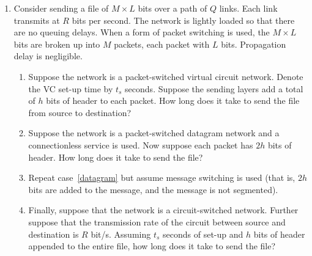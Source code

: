 \documentclass[11pt,a4paper]{article}
\begin{document}
\begin{enumerate}

  \item Consider sending a file of \(M \times L\) bits over a path of
    \(Q\) links. Each link transmits at \(R\) bits per second. The
    network is lightly loaded so that there are no queuing
    delays. When a form of packet switching is used, the \(M \times
    L\) bits are broken up into \(M\) packets, each packet with \(L\)
    bits. Propagation delay is negligible.
    \begin{enumerate}

      \item Suppose the network is a packet-switched virtual circuit
        network. Denote the VC set-up time by \(t_s\) seconds. Suppose
        the sending layers add a total of \(h\) bits of header to each
        packet. How long does it take to send the file from source to
        destination?

      \item \label{datagram} Suppose the network is a packet-switched
        datagram network and a connectionless service is used. Now
        suppose each packet has \(2h\) bits of header. How long does
        it take to send the file?

      \item Repeat case~\ref{datagram} but assume message switching is
        used (that is, \(2h\) bits are added to the message, and the
        message is not segmented).

      \item Finally, suppose that the network is a circuit-switched
        network. Further suppose that the transmission rate of the
        circuit between source and destination is \(R\)
        bit/s. Assuming \(t_s\) seconds of set-up and \(h\) bits of
        header appended to the entire file, how long does it take to
        send the file?

    \end{enumerate}

\end{enumerate}
\end{document}
